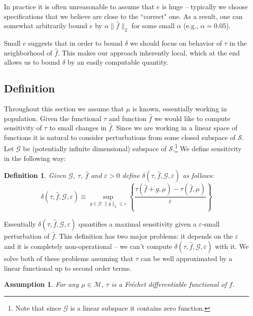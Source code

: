 \documentclass[12pt]{article}
\theoremstyle{plain}
\newtheorem{definition}[theorem]{Definition}
\newtheorem{assumption}[theorem]{Assumption}
\begin{document}
In practice it is often unreasonable to assume that $e$ is huge -- typically we choose specifications that we believe are close to the ``correct" one. As a result, one can somewhat arbitrarily bound $e$ by $\alpha \|\hat f\|_2$ for some small $\alpha$ (e.g., $\alpha = 0.05$). 

Small $e$ suggests that in order to bound $\delta$ we should focus on behavior of $\tau$ in the neighborhood of $\hat f$. This makes our approach inherently local, which at the end allows us to bound $\delta$ by an easily computable quantity. 



\subsection{Definition}

Throughout this section we assume that $\mu$ is known, essentially working in population. Given the functional $\tau$ and function $\hat f$ we would like to compute sensitivity of $\tau$ to small changes in $\hat f$. Since we are working in a linear space of functions it is natural to consider perturbations from some closed subspace of $\mathcal{S}$. Let $\mathcal{G}$ be (potentially infinite dimensional) subspace of $\mathcal{S}$.\footnote{Note that since $\mathcal{G}$ is a linear subspace it contains zero function.}  We define sensitivity in the following way:

\begin{definition}
Given $\mathcal{G}$, $\tau$, $\hat f$ and $\varepsilon > 0$ define $\delta(\tau, \hat f, \mathcal{G}, \varepsilon)$ as follows:
\begin{equation}
\delta(\tau, \hat f, \mathcal{G},\varepsilon) \equiv \sup_{g\in \mathcal{G}: \| g\|_2 \le \varepsilon}\left\{\frac{\tau(\hat f+g,\mu)-\tau(\hat f, \mu)}{\varepsilon}\right\}
\end{equation}
\end{definition}

Essentially $\delta(\tau, \hat f, \mathcal{G},\varepsilon)$  quantifies a maximal sensitivity given a $\varepsilon$-small perturbation of $\hat f$. This definition has two major problems: it depends on the $\varepsilon$ and it is completely non-operational -- we can't compute $\delta(\tau, \hat f, \mathcal{G},\varepsilon)$ with it. We solve both of these problems assuming that $\tau$ can be well approximated by a linear functional up to second order terms. 

\begin{assumption}\label{Frechet} 
For any $\mu\in\mathcal{M}$, $\tau$ is a Fr\'echet differentiable functional of $f$.
\end{assumption}
\end{document}
